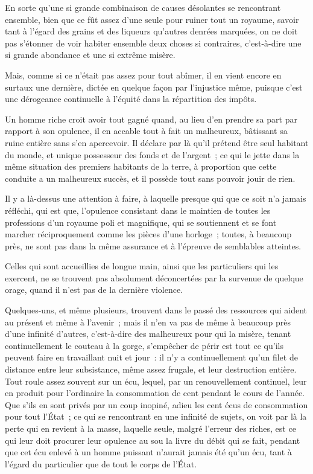 \documentclass[french,twoside]{book} %
\begin{document}
En sorte qu’une si grande combinaison de causes désolantes se rencontrant ensemble, bien que ce fût assez d’une seule pour ruiner tout un royaume, savoir tant à l’égard des grains et des liqueurs qu’autres denrées marquées, on ne doit pas s’étonner de voir habiter ensemble deux choses si contraires, c’est-à-dire une si grande abondance et une si extrême misère.\par
Mais, comme si ce n’était pas assez pour tout abîmer, il en vient encore en surtaux une dernière, dictée en quelque façon par l’injustice même, puisque c’est une dérogeance continuelle à l’équité dans la répartition des impôts.\par
Un homme riche croit avoir tout gagné quand, au lieu d’en prendre sa part par rapport à son opulence, il en accable tout à fait un malheureux, bâtissant sa ruine entière sans s’en apercevoir. Il déclare par là qu’il prétend être seul habitant du monde, et unique possesseur des fonds et de l’argent ; ce qui le jette dans la même situation des premiers habitants de la terre, à proportion que cette conduite a un malheureux succès, et il possède tout sans pouvoir jouir de rien.\par
Il y a là-dessus une attention à faire, à laquelle presque qui que ce soit n’a jamais réfléchi, qui est que, l’opulence consistant dans le maintien de toutes les professions d’un royaume poli et magnifique, qui se soutiennent et se font marcher réciproquement comme les pièces d’une horloge ; toutes, à beaucoup près, ne sont pas dans la même assurance et à l’épreuve de semblables atteintes.\par
Celles qui sont accueillies de longue main, ainsi que les particuliers qui les exercent, ne se trouvent pas absolument déconcertées par la survenue de quelque orage, quand il n’est pas de la dernière violence.\par
Quelques-uns, et même plusieurs, trouvent dans le passé des ressources qui aident au présent et même à l’avenir ; mais il n’en va pas de même à beaucoup près d’une infinité d’autres, c’est-à-dire des malheureux pour qui la misère, tenant continuellement le couteau à la gorge, s’empêcher de périr est tout ce qu’ils peuvent faire en travaillant nuit et jour : il n’y a continuellement qu’un filet de distance entre leur subsistance, même assez frugale, et leur destruction entière. Tout roule assez souvent sur un écu, lequel, par un renouvellement continuel, leur en produit pour l’ordinaire la consommation de cent pendant le cours de l’année. Que s’ils en sont privés par un coup inopiné, adieu les cent écus de consommation pour tout l’État ; ce qui se rencontrant en une infinité de sujets, on voit par là la perte qui en revient à la masse, laquelle seule, malgré l’erreur des riches, est ce qui leur doit procurer leur opulence au sou la livre du débit qui se fait, pendant que cet écu enlevé à un homme puissant n’aurait jamais été qu’un écu, tant à l’égard du particulier que de tout le corps de l’État.\par
\end{document}
